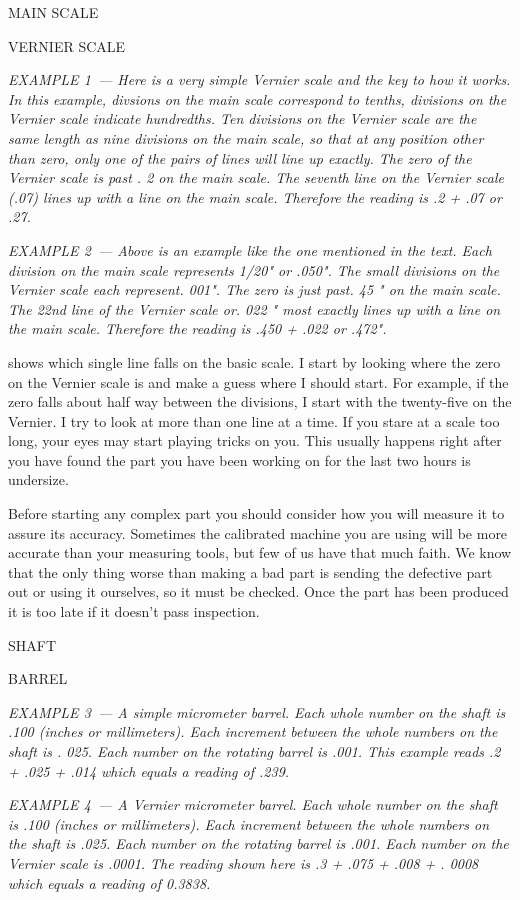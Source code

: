 \bigskip
MAIN SCALE

VERNIER SCALE
\bigskip

\textit{EXAMPLE 1\ --- Here is a very simple Vernier scale and the key to how it
works. In this example, divsions on the main scale correspond to tenths,
divisions on the Vernier scale indicate hundredths. Ten divisions on the Vernier
scale are the same length as nine divisions on the main scale, so that at any
position other than zero, only one of the pairs of lines will line up exactly.
The zero of the Vernier scale is past . 2 on the main scale. The seventh line on
the Vernier scale (.07) lines up with a line on the main scale. Therefore the
reading is .2 + .07 or .27.}
\bigskip

\textit{EXAMPLE 2\ --- Above is an example like the one mentioned in the text.
Each division on the main scale represents 1/20" or .050". The small divisions
on the Vernier scale each represent. 001". The zero is just past. 45 " on the
main scale. The 22nd line of the Vernier scale or. 022 " most exactly lines up
with a line on the main scale. Therefore the reading is .450 + .022 or .472".}
\bigskip

shows which single line falls on the basic scale. I start by looking where the
zero on the Vernier scale is and make a guess where I should start. For example,
if the zero falls about half way between the divisions, I start with the
twenty-five on the Vernier. I try to look at more than one line at a time. If
you stare at a scale too long, your eyes may start playing tricks on you. This
usually happens right after you have found the part you have been working on for
the last two hours is undersize.


Before starting any complex part you should consider how you will measure it to
assure its accuracy. Sometimes the calibrated machine you are using will be more
accurate than your measuring tools, but few of us have that much faith. We know
that the only thing worse than making a bad part is sending the defective part
out or using it ourselves, so it must be checked. Once the part has been
produced it is too late if it doesn't pass inspection.

\bigskip
SHAFT

BARREL
\bigskip

\textit{EXAMPLE 3\ --- A simple micrometer barrel. Each whole number on the
shaft is .100 (inches or millimeters). Each increment between the whole numbers
on the shaft is . 025. Each number on the rotating barrel is .001. This example
reads .2 + .025 + .014 which equals a reading of .239.}
\bigskip

\textit{EXAMPLE 4\ --- A Vernier micrometer barrel. Each whole number on the
shaft is .100 (inches or millimeters). Each increment between the whole numbers
on the shaft is .025. Each number on the rotating barrel is .001. Each number on
the Vernier scale is .0001. The reading shown here is .3 + .075 + .008 + . 0008
which equals a reading of 0.3838.}
\bigskip



\secup

